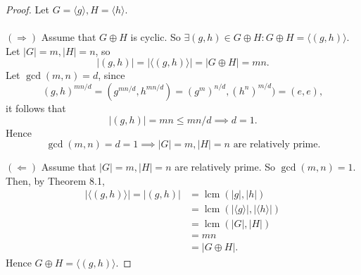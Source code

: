 \documentclass{article}
\DeclareMathOperator{\lcm}{lcm}
\newtheorem{theorem}{Theorem}[section]
\newtheorem{corollary}{Corollary}[theorem]
\theoremstyle{definition}
\begin{document}
     \noindent{}
     
     \begin{proof}
        Let $G = \langle g \rangle, H = \langle h \rangle$.
        \\ \\
        $(\Rightarrow)$ Assume that $G \oplus H$ is cyclic. So $\exists (g,h) \in G \oplus H: G \oplus H = \langle (g,h) \rangle$. Let $|G|=m,|H|=n$, so
        \begin{equation*}
            |(g,h)| = |\langle (g,h) \rangle| = |G \oplus H| = mn.
        \end{equation*}
        Let $\gcd(m,n)=d$, since
        \begin{equation*}
            (g,h)^{mn/d} = (g^{mn/d},h^{mn/d}) = (g^m)^{n/d},(h^n)^{m/d}) = (e,e),
        \end{equation*}
        it follows that
        \begin{equation*}
            |(g,h)| = mn \leq mn/d \implies d = 1.
        \end{equation*}
        Hence
        \begin{equation*}
            \gcd(m,n)=d=1 \implies |G|=m,|H|=n \text{ are relatively prime.}
        \end{equation*}

        \noindent $(\Leftarrow)$ Assume that $|G|=m,|H|=n$ are relatively prime. So $\gcd(m,n)=1$. Then, by Theorem 8.1,
        \begin{align*}
            |\langle (g,h) \rangle| = |(g,h)| &= \lcm(|g|,|h|) \\ 
            &= \lcm(|\langle g \rangle|,|\langle h \rangle|) \\
            &= \lcm(|G|,|H|) \\
            &= mn \\
            &= |G \oplus H|.
        \end{align*}
        Hence $G \oplus H = \langle (g,h) \rangle$.
     \end{proof}
     
     \noindent{}
     \\ \\
     
\end{document}
